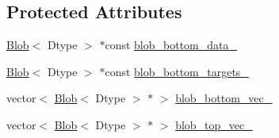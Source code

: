 \subsection*{Protected Attributes}
\begin{DoxyCompactItemize}
\item 
\hyperlink{classcaffe_1_1_blob}{Blob}$<$ Dtype $>$ $\ast$const \hyperlink{classcaffe_1_1_sigmoid_cross_entropy_loss_layer_test_a71b088ee944ae7f6ebf51cca865a566b}{blob\+\_\+bottom\+\_\+data\+\_\+}
\item 
\hyperlink{classcaffe_1_1_blob}{Blob}$<$ Dtype $>$ $\ast$const \hyperlink{classcaffe_1_1_sigmoid_cross_entropy_loss_layer_test_a1425d611414efbf1d4b338c69e583064}{blob\+\_\+bottom\+\_\+targets\+\_\+}
\item 
vector$<$ \hyperlink{classcaffe_1_1_blob}{Blob}$<$ Dtype $>$ $\ast$ $>$ \hyperlink{classcaffe_1_1_sigmoid_cross_entropy_loss_layer_test_a0361babc3565e93e60335f047d092fd9}{blob\+\_\+bottom\+\_\+vec\+\_\+}
\item 
vector$<$ \hyperlink{classcaffe_1_1_blob}{Blob}$<$ Dtype $>$ $\ast$ $>$ \hyperlink{classcaffe_1_1_sigmoid_cross_entropy_loss_layer_test_ab38651b1211dc5fec113f7ad70f65221}{blob\+\_\+top\+\_\+vec\+\_\+}
\end{DoxyCompactItemize}


